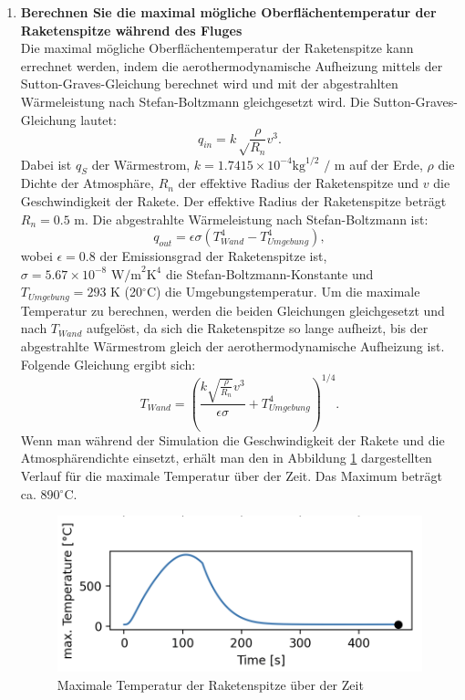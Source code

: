 \documentclass[12pt]{article}
\begin{document}
\begin{enumerate}
    \item \textbf{Berechnen Sie die maximal mögliche Oberflächentemperatur der Raketenspitze während des Fluges}\\
    Die maximal mögliche Oberflächentemperatur der Raketenspitze kann errechnet werden, indem die aerothermodynamische Aufheizung mittels der Sutton-Graves-Gleichung berechnet wird und mit der abgestrahlten Wärmeleistung nach Stefan-Boltzmann gleichgesetzt wird. Die Sutton-Graves-Gleichung lautet:
    \begin{equation}
        q_{in} = k \sqrt\frac{\rho}{R_n} v^3.
    \end{equation}
    Dabei ist $q_S$ der Wärmestrom, $k = 1.7415 \times 10^{-4} \text{kg}^{1/2} \text{ / m}$ auf der Erde, $\rho$ die Dichte der Atmosphäre, $R_n$ der effektive Radius der Raketenspitze und $v$ die Geschwindigkeit der Rakete. Der effektive Radius der Raketenspitze beträgt $R_n = 0.5 \text{ m}$. Die abgestrahlte Wärmeleistung nach Stefan-Boltzmann ist: 
    \begin{equation}
        q_{out} = \epsilon \sigma (T_{Wand}^4 - T_{Umgebung}^4),
    \end{equation}
    wobei $\epsilon = 0.8$ der Emissionsgrad der Raketenspitze ist, $\sigma = 5.67 \times 10^{-8} \text{ W/m}^2 \text{K}^4$ die Stefan-Boltzmann-Konstante und $T_{Umgebung} = 293 \text{ K}$ (20$^\circ$C) die Umgebungstemperatur. Um die maximale Temperatur zu berechnen, werden die beiden Gleichungen gleichgesetzt und nach $T_{Wand}$ aufgelöst, da sich die Raketenspitze so lange aufheizt, bis der abgestrahlte Wärmestrom gleich der aerothermodynamische Aufheizung ist. Folgende Gleichung ergibt sich:
    \begin{equation}
        T_{Wand} = \left( \frac{k \sqrt{\frac{\rho}{R_n}}v^3}{\epsilon \sigma} + T_{Umgebung}^4 \right)^{1/4}.
    \end{equation}
    Wenn man während der Simulation die Geschwindigkeit der Rakete und die Atmosphärendichte einsetzt, erhält man den in Abbildung \ref{fig:max_temp} dargestellten Verlauf für die maximale Temperatur über der Zeit. Das Maximum beträgt ca. 890$^\circ$C.
    \begin{figure}
        \centering
        \includegraphics[width=.8\textwidth]{images/max_temp.png}
        \caption{Maximale Temperatur der Raketenspitze über der Zeit}
        \label{fig:max_temp}
    \end{figure}


\end{enumerate}
\end{document}
